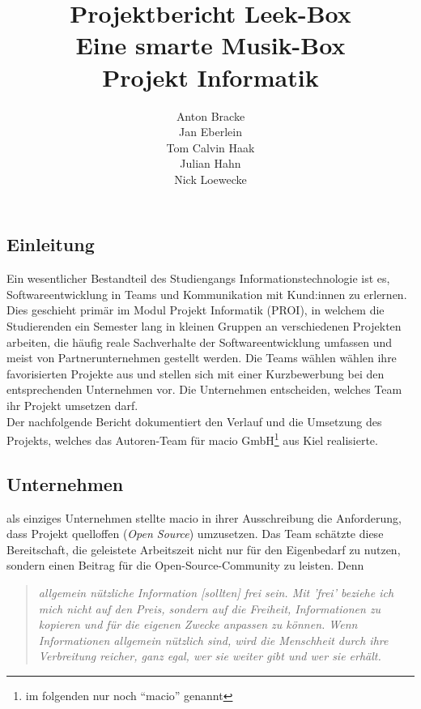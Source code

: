 \documentclass[10pt, a4paper]{article}
\title{Projektbericht Leek-Box \\\large Eine smarte Musik-Box \\ Projekt Informatik}
\author{Anton Bracke\\Jan Eberlein\\Tom Calvin Haak\\Julian Hahn\\Nick Loewecke}
\begin{document}
\begin{onehalfspace}
\maketitle
\newpage
\tableofcontents
\newpage




\section{Einleitung}
Ein wesentlicher Bestandteil des Studiengangs \glqq Informationstechnologie\grqq{} ist es, Softwareentwicklung in Teams und Kommunikation mit Kund:innen zu erlernen. \cite{Qualifikationsziele_Informationstechnologie}
Dies geschieht primär im Modul \glqq Projekt Informatik (PROI)\grqq{},
 in welchem die Studierenden ein Semester lang in kleinen Gruppen an verschiedenen Projekten arbeiten,
  die häufig reale Sachverhalte der Softwareentwicklung umfassen und meist von Partnerunternehmen gestellt werden.
Die Teams wählen wählen ihre favorisierten Projekte aus und stellen sich mit einer Kurzbewerbung bei den entsprechenden Unternehmen vor.
Die Unternehmen entscheiden, welches Team ihr Projekt umsetzen darf.
\\
Der nachfolgende Bericht dokumentiert den Verlauf und die Umsetzung des Projekts, welches das Autoren-Team für macio GmbH\footnote{im folgenden nur noch \enquote{macio} genannt} aus Kiel realisierte.

\subsection{Unternehmen}
als einziges Unternehmen stellte macio in ihrer Ausschreibung die Anforderung, dass Projekt quelloffen (\textit{Open Source}) umzusetzen.
Das Team schätzte diese Bereitschaft, die geleistete Arbeitszeit nicht nur für den Eigenbedarf zu nutzen, sondern einen Beitrag für die Open-Source-Community zu leisten.
Denn

\begin{quote}
  \textit{allgemein nützliche Information [sollten] frei sein.
  Mit 'frei' beziehe ich mich nicht auf den Preis, sondern auf die Freiheit, Informationen zu kopieren und für die eigenen Zwecke anpassen zu können.
  Wenn Informationen allgemein nützlich sind, wird die Menschheit durch ihre Verbreitung reicher, ganz egal, wer sie weiter gibt und wer sie erhält.}
  \cite{openSource}
\end{quote}


\end{onehalfspace}
\end{document}
